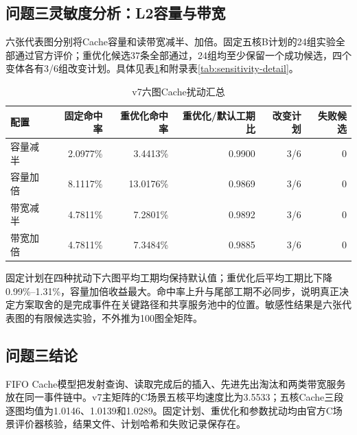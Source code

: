 \subsection{问题三灵敏度分析：L2容量与带宽}
六张代表图分别将Cache容量和读带宽减半、加倍。固定五核B计划的24组实验全部通过官方评价；重优化候选37条全部通过，24组均至少保留一个成功候选，四个变体各有3/6组改变计划。具体见表\ref{tab:cache-sensitivity}和附录表\ref{tab:sensitivity-detail}。
\begin{table}[H]\centering\small\caption{v7六图Cache扰动汇总}\label{tab:cache-sensitivity}
\begin{tabular}{lrrrrr}\toprule
配置 & 固定命中率 & 重优化命中率 & 重优化/默认工期比 & 改变计划 & 失败候选\\\midrule
容量减半 & 2.0977\% & 3.4413\% & 0.9900 & 3/6 & 0\\
容量加倍 & 8.1117\% & 13.0176\% & 0.9869 & 3/6 & 0\\
带宽减半 & 4.7811\% & 7.2801\% & 0.9892 & 3/6 & 0\\
带宽加倍 & 4.7811\% & 7.3484\% & 0.9885 & 3/6 & 0\\\bottomrule
\end{tabular}
\end{table}

固定计划在四种扰动下六图平均工期均保持默认值；重优化后平均工期比下降0.99\%--1.31\%，容量加倍收益最大。命中率上升与尾部工期不必同步，说明真正决定方案取舍的是完成事件在关键路径和共享服务池中的位置。敏感性结果是六张代表图的有限候选实验，不外推为100图全矩阵。

\subsection{问题三结论}
FIFO Cache模型把发射查询、读取完成后的插入、先进先出淘汰和两类带宽服务放在同一事件链中。v7主矩阵的C场景五核平均速度比为3.5533；五核Cache三段逐图均值为1.0146、1.0139和1.0289。固定计划、重优化和参数扰动均由官方C场景评价器核验，结果文件、计划哈希和失败记录保存在。
